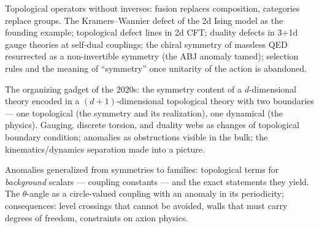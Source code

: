 Topological operators without inverses: fusion replaces composition, categories replace groups. The Kramers--Wannier defect of the 2d Ising model as the founding example; topological defect lines in 2d CFT; duality defects in 3+1d gauge theories at self-dual couplings; the chiral symmetry of massless QED resurrected as a non-invertible symmetry (the ABJ anomaly tamed); selection rules and the meaning of ``symmetry'' once unitarity of the action is abandoned.

The organizing gadget of the 2020s: the symmetry content of a $d$-dimensional theory encoded in a $(d{+}1)$-dimensional topological theory with two boundaries --- one topological (the symmetry and its realization), one dynamical (the physics). Gauging, discrete torsion, and duality webs as changes of topological boundary condition; anomalies as obstructions visible in the bulk; the kinematics/dynamics separation made into a picture.

Anomalies generalized from symmetries to families: topological terms for \emph{background} scalars --- coupling constants --- and the exact statements they yield. The $\theta$-angle as a circle-valued coupling with an anomaly in its periodicity; consequences: level crossings that cannot be avoided, walls that must carry degrees of freedom, constraints on axion physics.

